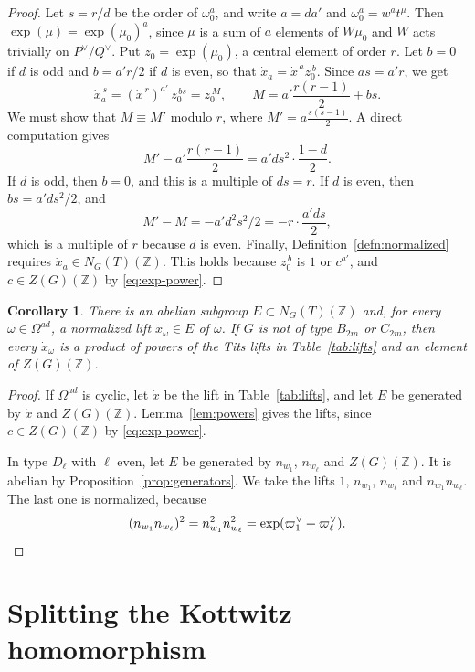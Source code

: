 \documentclass[psamsfonts]{amsart}
\newtheorem{cor}[thm]{Corollary}
\theoremstyle{definition}
\theoremstyle{remark}
\numberwithin{equation}{section}
\newcommand{\Z}{\mathbb{Z}}   %
\numberwithin{equation}{section}
\newcommand{\om}{\omega}
\newcommand{\Om}{\Omega}
\theoremstyle{plain}
\begin{document}
\begin{proof}
Let $s=r/d$ be the order of $\om_0^a$, and write $a=da'$ and $\om_0^a=w^at^{\mu}$. Then $\exp(\mu)=\exp(\mu_0)^a$, since $\mu$ is a sum of $a$ elements of $W\mu_0$ and $W$ acts trivially on $P^\vee/Q^\vee$. Put $z_0=\exp(\mu_0)$, a central element of order $r$. Let $b=0$ if $d$ is odd and $b=a'r/2$ if $d$ is even, so that $\dot x_a=\dot x^{\,a}z_0^{\,b}$. Since $as=a'r$, we get
\[
\dot x_a^{\,s}=(\dot x^{\,r})^{a'}\,z_0^{\,bs}=z_0^{\,M},\qquad M=a'\frac{r(r-1)}2+bs.
\]
We must show that $M\equiv M'$ modulo $r$, where $M'=a\frac{s(s-1)}2$. A direct computation gives
\[
M'-a'\frac{r(r-1)}2=a'ds^2\cdot\frac{1-d}2.
\]
If $d$ is odd, then $b=0$, and this is a multiple of $ds=r$. If $d$ is even, then $bs=a'ds^2/2$, and
\[
M'-M=-a'd^2s^2/2=-r\cdot\frac{a'ds}2,
\]
which is a multiple of $r$ because $d$ is even. Finally, Definition~\ref{defn:normalized} requires $\dot x_a\in N_G(T)(\Z)$. This holds because $z_0^{\,b}$ is $1$ or $c^{a'}$, and $c\in Z(G)(\Z)$ by \eqref{eq:exp-power}.
\end{proof}

\begin{cor}\label{cor:family}
There is an abelian subgroup $E\subset N_G(T)(\Z)$ and, for every $\om\in\Om^{ad}$, a normalized lift $\dot x_\om\in E$ of $\om$. If $G$ is not of type $B_{2m}$ or $C_{2m}$, then every $\dot x_\om$ is a product of powers of the Tits lifts in Table~\ref{tab:lifts} and an element of $Z(G)(\Z)$.
\end{cor}

\begin{proof}
If $\Om^{ad}$ is cyclic, let $\dot x$ be the lift in Table~\ref{tab:lifts}, and let $E$ be generated by $\dot x$ and $Z(G)(\Z)$. Lemma~\ref{lem:powers} gives the lifts, since $c\in Z(G)(\Z)$ by \eqref{eq:exp-power}.

In type $D_\ell$ with $\ell$ even, let $E$ be generated by $n_{w_1}$, $n_{w_\ell}$ and $Z(G)(\Z)$. It is abelian by Proposition~\ref{prop:generators}. We take the lifts $1$, $n_{w_1}$, $n_{w_\ell}$ and $n_{w_1}n_{w_\ell}$. The last one is normalized, because
\[
(n_{w_1}n_{w_\ell})^2=n_{w_1}^2n_{w_\ell}^2=\exp(\varpi_1^\vee+\varpi_\ell^\vee).\qedhere
\]
\end{proof}

\section{Splitting the Kottwitz homomorphism}\label{sec:thmA}
\end{document}

